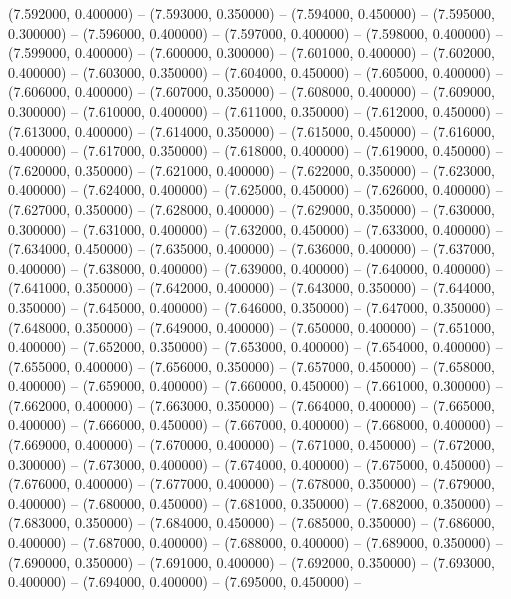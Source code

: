 (7.592000, 0.400000) -- 
(7.593000, 0.350000) -- 
(7.594000, 0.450000) -- 
(7.595000, 0.300000) -- 
(7.596000, 0.400000) -- 
(7.597000, 0.400000) -- 
(7.598000, 0.400000) -- 
(7.599000, 0.400000) -- 
(7.600000, 0.300000) -- 
(7.601000, 0.400000) -- 
(7.602000, 0.400000) -- 
(7.603000, 0.350000) -- 
(7.604000, 0.450000) -- 
(7.605000, 0.400000) -- 
(7.606000, 0.400000) -- 
(7.607000, 0.350000) -- 
(7.608000, 0.400000) -- 
(7.609000, 0.300000) -- 
(7.610000, 0.400000) -- 
(7.611000, 0.350000) -- 
(7.612000, 0.450000) -- 
(7.613000, 0.400000) -- 
(7.614000, 0.350000) -- 
(7.615000, 0.450000) -- 
(7.616000, 0.400000) -- 
(7.617000, 0.350000) -- 
(7.618000, 0.400000) -- 
(7.619000, 0.450000) -- 
(7.620000, 0.350000) -- 
(7.621000, 0.400000) -- 
(7.622000, 0.350000) -- 
(7.623000, 0.400000) -- 
(7.624000, 0.400000) -- 
(7.625000, 0.450000) -- 
(7.626000, 0.400000) -- 
(7.627000, 0.350000) -- 
(7.628000, 0.400000) -- 
(7.629000, 0.350000) -- 
(7.630000, 0.300000) -- 
(7.631000, 0.400000) -- 
(7.632000, 0.450000) -- 
(7.633000, 0.400000) -- 
(7.634000, 0.450000) -- 
(7.635000, 0.400000) -- 
(7.636000, 0.400000) -- 
(7.637000, 0.400000) -- 
(7.638000, 0.400000) -- 
(7.639000, 0.400000) -- 
(7.640000, 0.400000) -- 
(7.641000, 0.350000) -- 
(7.642000, 0.400000) -- 
(7.643000, 0.350000) -- 
(7.644000, 0.350000) -- 
(7.645000, 0.400000) -- 
(7.646000, 0.350000) -- 
(7.647000, 0.350000) -- 
(7.648000, 0.350000) -- 
(7.649000, 0.400000) -- 
(7.650000, 0.400000) -- 
(7.651000, 0.400000) -- 
(7.652000, 0.350000) -- 
(7.653000, 0.400000) -- 
(7.654000, 0.400000) -- 
(7.655000, 0.400000) -- 
(7.656000, 0.350000) -- 
(7.657000, 0.450000) -- 
(7.658000, 0.400000) -- 
(7.659000, 0.400000) -- 
(7.660000, 0.450000) -- 
(7.661000, 0.300000) -- 
(7.662000, 0.400000) -- 
(7.663000, 0.350000) -- 
(7.664000, 0.400000) -- 
(7.665000, 0.400000) -- 
(7.666000, 0.450000) -- 
(7.667000, 0.400000) -- 
(7.668000, 0.400000) -- 
(7.669000, 0.400000) -- 
(7.670000, 0.400000) -- 
(7.671000, 0.450000) -- 
(7.672000, 0.300000) -- 
(7.673000, 0.400000) -- 
(7.674000, 0.400000) -- 
(7.675000, 0.450000) -- 
(7.676000, 0.400000) -- 
(7.677000, 0.400000) -- 
(7.678000, 0.350000) -- 
(7.679000, 0.400000) -- 
(7.680000, 0.450000) -- 
(7.681000, 0.350000) -- 
(7.682000, 0.350000) -- 
(7.683000, 0.350000) -- 
(7.684000, 0.450000) -- 
(7.685000, 0.350000) -- 
(7.686000, 0.400000) -- 
(7.687000, 0.400000) -- 
(7.688000, 0.400000) -- 
(7.689000, 0.350000) -- 
(7.690000, 0.350000) -- 
(7.691000, 0.400000) -- 
(7.692000, 0.350000) -- 
(7.693000, 0.400000) -- 
(7.694000, 0.400000) -- 
(7.695000, 0.450000) -- 
